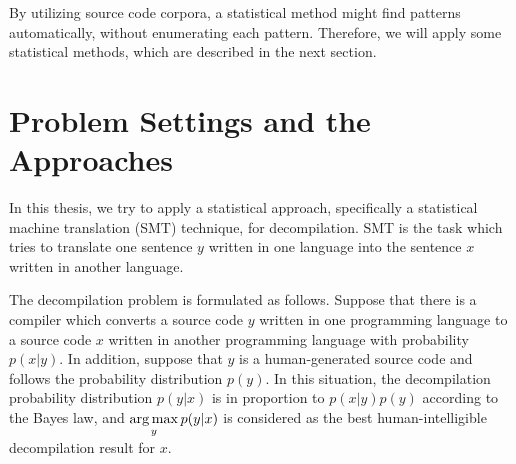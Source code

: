 \documentclass[11pt]{jarticle}
\newcommand{\argmax}{\mathop{\rm arg\,max}\limits}
\begin{document}
By utilizing source code corpora, a statistical method might find patterns automatically, without enumerating each pattern.
Therefore, we will apply some statistical methods, which are described in the next section.















\section{Problem Settings and the Approaches}

In this thesis, we try to apply a statistical approach, specifically a statistical machine translation (SMT) technique, for decompilation.
SMT is the task which tries to translate one sentence $y$ written in one language into the sentence $x$ written in another language.

The decompilation problem is formulated as follows. 
Suppose that there is a compiler which converts a source code $ y $ written in one programming language 
to a source code $ x $  written in another programming language with probability $p(x|y)$.
In addition, suppose that $ y $ is a human-generated source code and follows the probability distribution $ p(y) $.
In this situation, the decompilation probability distribution $ p(y|x) $ is in proportion to $ p(x|y)p(y) $ according to the Bayes law, 
and $\argmax_{y} p(y|x)$ is considered as the best human-intelligible decompilation result for $x$.
\end{document}
